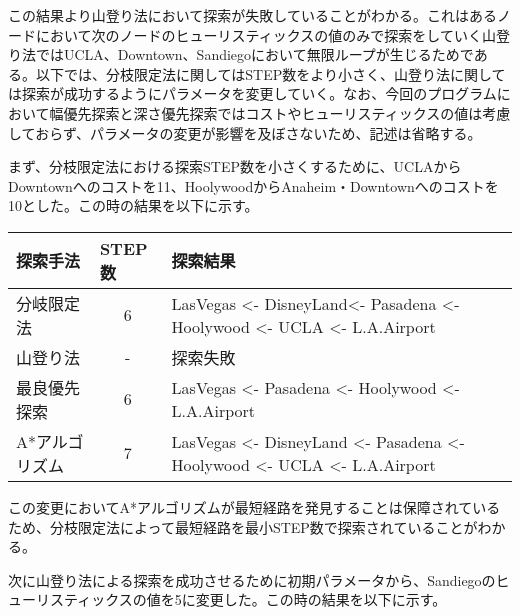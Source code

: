 \documentclass[a4j]{jarticle}
\begin{document}
この結果より山登り法において探索が失敗していることがわかる。これはあるノードにおいて次のノードのヒューリスティックスの値のみで探索をしていく山登り法ではUCLA、Downtown、Sandiegoにおいて無限ループが生じるためである。以下では、分枝限定法に関してはSTEP数をより小さく、山登り法に関しては探索が成功するようにパラメータを変更していく。なお、今回のプログラムにおいて幅優先探索と深さ優先探索ではコストやヒューリスティックスの値は考慮しておらず、パラメータの変更が影響を及ぼさないため、記述は省略する。

まず、分枝限定法における探索STEP数を小さくするために、UCLAからDowntownへのコストを11、HoolywoodからAnaheim・Downtownへのコストを10とした。この時の結果を以下に示す。


\begin{table}[ht]
\begin{tabular}{|l|c|l|}
\hline
探索手法 & \multicolumn{1}{l|}{STEP数} & 探索結果                                                                                                                     \\ \hline
分岐限定法 & 6 & LasVegas \textless{}- DisneyLand\textless{}- Pasadena \textless{}- Hoolywood \textless{}- UCLA \textless{}- L.A.Airport  \\ \hline
山登り法 & - & 探索失敗                                                                                                  \\ \hline
最良優先探索 & 6 & LasVegas \textless{}- Pasadena \textless{}- Hoolywood \textless{}- L.A.Airport                   \\ \hline
A*アルゴリズム & 7 & LasVegas \textless{}- DisneyLand \textless{}- Pasadena \textless{}- Hoolywood \textless{}- UCLA \textless{}- L.A.Airport \\ \hline
\end{tabular}
\end{table}

この変更においてA*アルゴリズムが最短経路を発見することは保障されているため、分枝限定法によって最短経路を最小STEP数で探索されていることがわかる。

次に山登り法による探索を成功させるために初期パラメータから、Sandiegoのヒューリスティックスの値を5に変更した。この時の結果を以下に示す。
\end{document}
